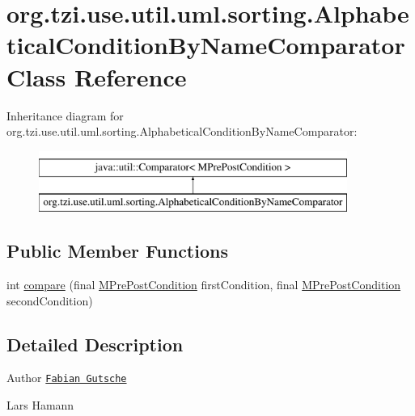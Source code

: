 \hypertarget{classorg_1_1tzi_1_1use_1_1util_1_1uml_1_1sorting_1_1_alphabetical_condition_by_name_comparator}{\section{org.\-tzi.\-use.\-util.\-uml.\-sorting.\-Alphabetical\-Condition\-By\-Name\-Comparator Class Reference}
\label{classorg_1_1tzi_1_1use_1_1util_1_1uml_1_1sorting_1_1_alphabetical_condition_by_name_comparator}
}
Inheritance diagram for org.\-tzi.\-use.\-util.\-uml.\-sorting.\-Alphabetical\-Condition\-By\-Name\-Comparator\-:\begin{figure}[H]
\begin{center}
\leavevmode
\includegraphics[height=2.000000cm]{classorg_1_1tzi_1_1use_1_1util_1_1uml_1_1sorting_1_1_alphabetical_condition_by_name_comparator}
\end{center}
\end{figure}
\subsection*{Public Member Functions}
\begin{DoxyCompactItemize}
\item 
int \hyperlink{classorg_1_1tzi_1_1use_1_1util_1_1uml_1_1sorting_1_1_alphabetical_condition_by_name_comparator_aa3792a310e1a4744328d030ddc00478a}{compare} (final \hyperlink{classorg_1_1tzi_1_1use_1_1uml_1_1mm_1_1_m_pre_post_condition}{M\-Pre\-Post\-Condition} first\-Condition, final \hyperlink{classorg_1_1tzi_1_1use_1_1uml_1_1mm_1_1_m_pre_post_condition}{M\-Pre\-Post\-Condition} second\-Condition)
\end{DoxyCompactItemize}


\subsection{Detailed Description}
\begin{DoxyAuthor}{Author}
\href{mailto:gutsche@tzi.de}{\tt Fabian Gutsche} 

Lars Hamann 
\end{DoxyAuthor}


